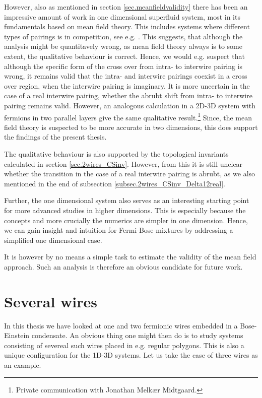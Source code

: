 However, also as mentioned in section \ref{sec.meanfieldvalidity} there has been an impressive amount of work in one dimensional superfluid system, most in its fundamentals based on mean field theory. This includes systems where different types of pairings is in competition, see e.g. \cite{LiYangChen, BudichTopInvMajoranaWires, BudichArdonne1DDIII}. This suggests, that although the analysis might be quantitavely wrong, as mean field theory always is to some extent, the qualitative behaviour is correct. Hence, we would e.g. suspect that although the specific form of the cross over from intra- to interwire pairing is wrong, it remains valid that the intra- and interwire pairings coexist in a cross over region, when the interwire pairing is imaginary. It is more uncertain in the case of a real interwire pairing, whether the abrubt shift from intra- to interwire pairing remains valid. However, an analogous calculation in a 2D-3D system with fermions in two parallel layers give the same qualitative result.\footnote{Private communication with Jonathan Melk{\ae}r Midtgaard.} Since, the mean field theory is suspected to be more accurate in two dimensions, this does support the findings of the present thesis. 

The qualitative behaviour is also supported by the topological invariants calculated in section \ref{sec.2wires_CSinv}. However, from this it is still unclear whether the transition in the case of a real interwire pairing is abrubt, as we also mentioned in the end of subsection \ref{subsec.2wires_CSinv_Delta12real}. 

Further, the one dimensional system also serves as an interesting starting point for more advanced studies in higher dimensions. This is especially because the concepts and more crucially the numerics are simpler in one dimension. Hence, we can gain insight and intuition for Fermi-Bose mixtures by addressing a simplified one dimensional case. 

It is however by no means a simple task to estimate the validity of the mean field approach. Such an analysis is therefore an obvious candidate for future work.

\section{Several wires}
In this thesis we have looked at one and two fermionic wires embedded in a Bose-Einstein condensate. An obvious thing one might then do is to study systems consisting of severeal such wires placed in e.g. regular polygons. This is also a unique configuration for the 1D-3D systems. Let us take the case of three wires as an example. 

